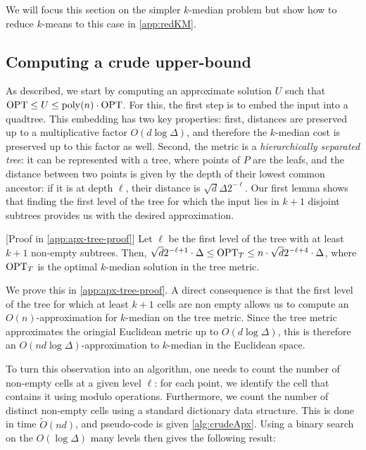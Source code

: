 We will focus this section on the simpler $k$-median problem but show how to reduce $k$-means to this case in \cref{app:redKM}.

\subsection{Computing a crude upper-bound}
\label{ssec:crude_bound}

As described, we start by computing an approximate solution $U$ such that $\text{OPT} \leq U \leq \operatorname{poly}(n) \cdot \text{OPT}$. For this, the first step is to embed the input
into a quadtree. This embedding has two key properties: first, distances are preserved up to a multiplicative factor $O(d \log \Delta)$, and therefore the
$k$-median cost is preserved up to this factor as well. Second, the metric is a \emph{hierarchically separated tree}: it can be represented with a tree, where
points of $P$ are the leafs, and the distance between two points is given by the depth of their lowest common ancestor: if it is at depth $\ell$, their distance
is $\sqrt{d} \Delta 2^{-\ell}$.  Our first lemma shows that finding the first level of the tree for which the input lies in $k+1$ disjoint subtrees provides us
with the desired approximation. 

\begin{lemma}\label{lem:apxTree} [Proof in \cref{app:apx-tree-proof}]
Let $\ell$ be the first level of the tree with at least $k+1$ non-empty subtrees. Then, $\sqrt{d}2^{-\ell+1} \cdot \Delta \leq
\text{OPT}_T \leq n \cdot \sqrt{d}2^{-\ell+4} \cdot \Delta$, where $\text{OPT}_T$ is the optimal $k$-median solution in the tree metric.

\end{lemma}

We prove this in \cref{app:apx-tree-proof}. A direct consequence  is that the first level of the tree for which at least $k+1$ cells are non empty allows us to
compute an $O(n)$-approximation for $k$-median on the tree metric. Since the tree metric approximates the oringial Euclidean metric up to $O(d \log
\Delta)$, this is therefore an $O(n d \log \Delta)$-approximation to $k$-median in the Euclidean space.

To turn this observation into an algorithm, one needs to count the number of non-empty cells at a given level $\ell$: for each point, we identify the cell that
contains it using modulo operations. Furthermore, we count the number of distinct non-empty cells using a standard dictionary data structure. This is done in
time $\tilde O(nd)$, and pseudo-code is given \cref{alg:crudeApx}. Using a binary search on the $O(\log \Delta)$ many levels then gives the following result:

